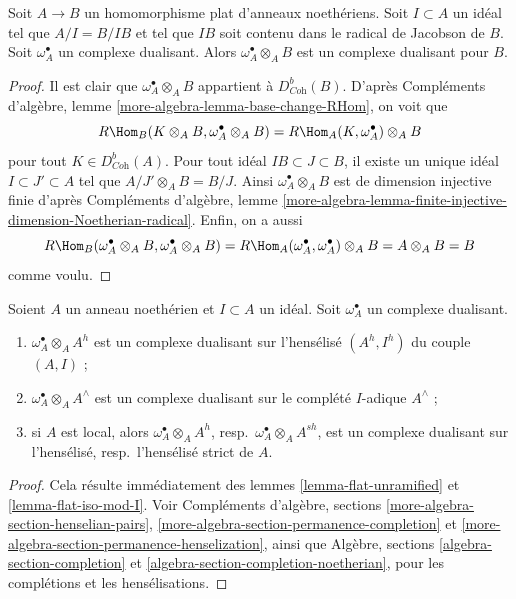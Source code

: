 \begin{lemma}
\label{lemma-flat-iso-mod-I}
Soit $A \to B$ un homomorphisme plat d'anneaux noethériens.
Soit $I \subset A$ un idéal tel que $A/I = B/IB$ et tel que $IB$
soit contenu dans le radical de Jacobson de $B$.
Soit $\omega_A^\bullet$ un complexe dualisant.
Alors $\omega_A^\bullet \otimes_A B$ est un complexe dualisant pour $B$.
\end{lemma}

\begin{proof}
Il est clair que $\omega_A^\bullet \otimes_A B$ appartient à $D^b_{\textit{Coh}}(B)$.
D'après Compléments d'algèbre, lemme \ref{more-algebra-lemma-base-change-RHom}, on voit que
$$
R\Hom_B(K \otimes_A B, \omega_A^\bullet \otimes_A B) =
R\Hom_A(K, \omega_A^\bullet) \otimes_A B
$$
pour tout $K \in D^b_{\textit{Coh}}(A)$. Pour tout idéal $IB \subset J \subset B$,
il existe un unique idéal $I \subset J' \subset A$ tel que $A/J' \otimes_A B = B/J$.
Ainsi $\omega_A^\bullet \otimes_A B$ est de dimension injective finie
d'après Compléments d'algèbre, lemme \ref{more-algebra-lemma-finite-injective-dimension-Noetherian-radical}.
Enfin, on a aussi
$$
R\Hom_B(\omega_A^\bullet \otimes_A B, \omega_A^\bullet \otimes_A B) =
R\Hom_A(\omega_A^\bullet, \omega_A^\bullet) \otimes_A B = A \otimes_A B = B
$$
comme voulu.
\end{proof}

\begin{lemma}
\label{lemma-completion-henselization-dualizing}
Soient $A$ un anneau noethérien et $I \subset A$ un idéal.
Soit $\omega_A^\bullet$ un complexe dualisant.
\begin{enumerate}
\item $\omega_A^\bullet \otimes_A A^h$ est un complexe dualisant sur l'hensélisé $(A^h, I^h)$ du couple $(A, I)$ ;
\item $\omega_A^\bullet \otimes_A A^\wedge$ est un complexe dualisant sur le complété $I$-adique $A^\wedge$ ;
\item si $A$ est local, alors $\omega_A^\bullet \otimes_A A^h$,
resp.\ $\omega_A^\bullet \otimes_A A^{sh}$, est un complexe dualisant
sur l'hensélisé, resp.\ l'hensélisé strict de $A$.
\end{enumerate}
\end{lemma}

\begin{proof}
Cela résulte immédiatement des lemmes \ref{lemma-flat-unramified} et \ref{lemma-flat-iso-mod-I}.
Voir Compléments d'algèbre, sections \ref{more-algebra-section-henselian-pairs}, \ref{more-algebra-section-permanence-completion} et \ref{more-algebra-section-permanence-henselization},
ainsi que Algèbre, sections \ref{algebra-section-completion} et \ref{algebra-section-completion-noetherian},
pour les complétions et les hensélisations.
\end{proof}

